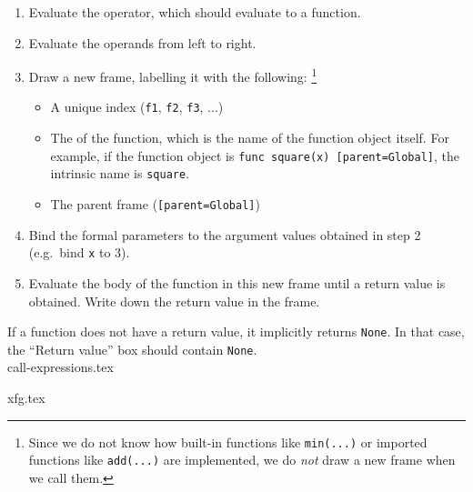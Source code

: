 \begin{questions}
\setlength{\skip\footins}{3 in}
\begin{enumerate}
    \item Evaluate the operator, which should evaluate to a function.
    \item Evaluate the operands from left to right.
    \item Draw a new frame, labelling it with the following:
        \footnote{Since we do not know how built-in functions
            like \texttt{min(...)} or imported functions like \texttt{add(...)} are implemented,
            we do \emph{not} draw a new frame when we call them.}
        \begin{itemize}
            \item A unique index (\texttt{f1}, \texttt{f2}, \texttt{f3}, ...)
            \item The  of the function, which is the
            name of the function object itself. For example, if the function
            object is \texttt{func square(x) [parent=Global]}, the intrinsic
            name is \texttt{square}.
            \item The parent frame (\texttt{[parent=Global]})
        \end{itemize}
    \item Bind the formal parameters to the argument values obtained in step 2
    (e.g.\ bind \texttt{x} to 3).
    \item Evaluate the body of the function in this new frame until a return
    value is obtained. Write down the return value in the frame.
\end{enumerate}

If a function does not have a return value, it implicitly returns
\texttt{None}.  In that case, the ``Return value'' box should contain
\texttt{None}. \\

{call-expressions.tex}

{xfg.tex}
\end{questions}

